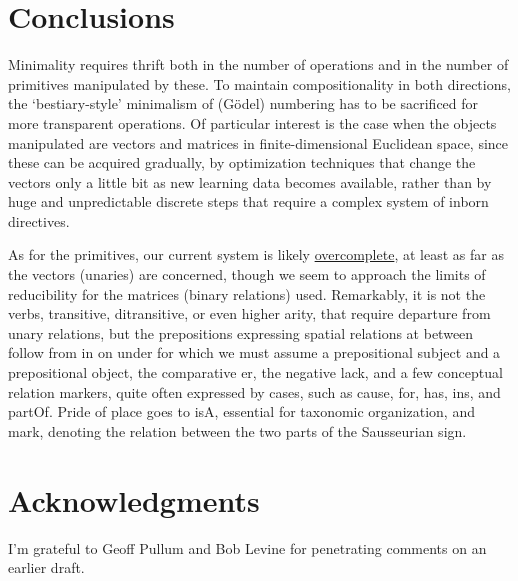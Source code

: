 \documentclass[output=paper,colorlinks=true,citecolor=brown]{langscibook}
\begin{document}
\section{Conclusions}

Minimality requires thrift both in the number of operations and in the number
of primitives manipulated by these. To maintain compositionality in both
directions, the `bestiary-style' minimalism of (G\"odel) numbering has to be
sacrificed for more transparent operations. Of particular interest is the case
when the objects manipulated are vectors and matrices in finite-dimensional
Euclidean space, since these can be acquired gradually, by optimization
techniques that change the vectors only a little bit as new learning data
becomes available, rather than by huge and unpredictable discrete steps that
require a complex system of inborn directives.

As for the primitives, our current system is likely
\href{https://en.wikipedia.org/wiki/Overcompleteness}{overcomplete}, at least
as far as the vectors (unaries) are concerned, though we seem to approach the
limits of reducibility for the matrices (binary relations) used. Remarkably,
it is not the verbs, transitive, ditransitive, or even higher arity, that
require departure from unary relations, but the prepositions expressing
spatial relations {\sc at between follow from in on under} for which we must
assume a prepositional subject and a prepositional object, the comparative
{\sc er}, the negative {\sc lack}, and a few conceptual relation markers,
quite often expressed by cases, such as {\sc cause, for, has, ins,} and {\sc
  partOf}. Pride of place goes to {\sc isA}, essential for taxonomic
organization, and {\sc mark}, denoting the relation between the two parts of
the Sausseurian sign.






\section*{Acknowledgments} I'm grateful to Geoff Pullum and Bob Levine for
penetrating comments on an earlier draft.

\printbibliography %
\end{document}
